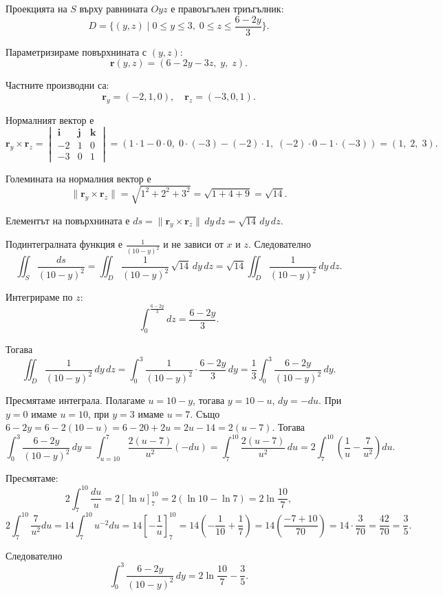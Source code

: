 \documentclass[10pt]{article}
\begin{document}
Проекцията на $S$ върху равнината $Oyz$ е правоъгълен триъгълник:
\[
D = \{(y,z) \mid 0 \le y \le 3,\; 0 \le z \le \frac{6-2y}{3}\}.
\]

Параметризираме повърхнината с $(y,z)$:
\[
\mathbf{r}(y,z) = (6-2y-3z,\; y,\; z).
\]

Частните производни са:
\[
\mathbf{r}_y = (-2,1,0), \quad \mathbf{r}_z = (-3,0,1).
\]

Нормалният вектор е
\[
\mathbf{r}_y \times \mathbf{r}_z = 
\begin{vmatrix}
\mathbf{i} & \mathbf{j} & \mathbf{k} \\
-2 & 1 & 0 \\
-3 & 0 & 1
\end{vmatrix} = (1\cdot1 - 0\cdot0,\; 0\cdot(-3) - (-2)\cdot1,\; (-2)\cdot0 - 1\cdot(-3)) = (1,\; 2,\; 3).
\]

Големината на нормалния вектор е
\[
\|\mathbf{r}_y \times \mathbf{r}_z\| = \sqrt{1^2 + 2^2 + 3^2} = \sqrt{1+4+9} = \sqrt{14}.
\]

Елементът на повърхнината е $ds = \|\mathbf{r}_y \times \mathbf{r}_z\| \, dy\,dz = \sqrt{14} \, dy\,dz$.

Подинтегралната функция е $\frac{1}{(10-y)^2}$ и не зависи от $x$ и $z$. Следователно
\[
\iint_S \frac{ds}{(10-y)^2} = \iint_D \frac{1}{(10-y)^2} \, \sqrt{14} \, dy\,dz = \sqrt{14} \iint_D \frac{1}{(10-y)^2} \, dy\,dz.
\]

Интегрираме по $z$:
\[
\int_{0}^{\frac{6-2y}{3}} dz = \frac{6-2y}{3}.
\]

Тогава
\[
\iint_D \frac{1}{(10-y)^2} \, dy\,dz = \int_0^3 \frac{1}{(10-y)^2} \cdot \frac{6-2y}{3} \, dy = \frac{1}{3} \int_0^3 \frac{6-2y}{(10-y)^2} \, dy.
\]

Пресмятаме интеграла. Полагаме $u = 10 - y$, тогава $y = 10 - u$, $dy = -du$. При $y = 0$ имаме $u = 10$, при $y = 3$ имаме $u = 7$. Също $6-2y = 6 - 2(10-u) = 6 - 20 + 2u = 2u - 14 = 2(u-7)$. Тогава
\[
\int_0^3 \frac{6-2y}{(10-y)^2} \, dy = \int_{u=10}^{7} \frac{2(u-7)}{u^2} (-du) = \int_{7}^{10} \frac{2(u-7)}{u^2} \, du = 2\int_{7}^{10} \left( \frac{1}{u} - \frac{7}{u^2} \right) du.
\]

Пресмятаме:
\[
2\int_{7}^{10} \frac{du}{u} = 2[\ln u]_{7}^{10} = 2(\ln 10 - \ln 7) = 2\ln\frac{10}{7},
\]
\[
2\int_{7}^{10} \frac{7}{u^2} du = 14\int_{7}^{10} u^{-2} du = 14\left[-\frac{1}{u}\right]_{7}^{10} = 14\left(-\frac{1}{10} + \frac{1}{7}\right) = 14\left(\frac{-7+10}{70}\right) = 14\cdot\frac{3}{70} = \frac{42}{70} = \frac{3}{5}.
\]

Следователно
\[
\int_0^3 \frac{6-2y}{(10-y)^2} \, dy = 2\ln\frac{10}{7} - \frac{3}{5}.
\]
\end{document}
